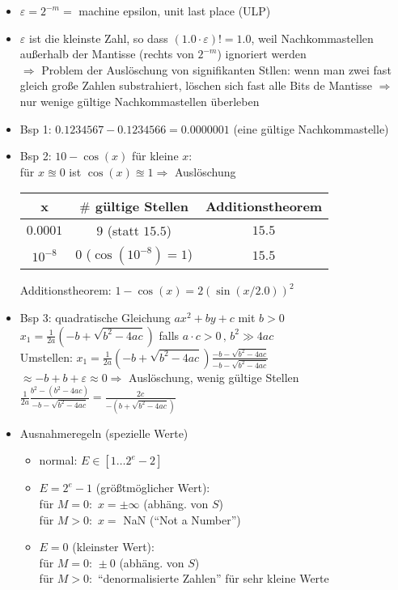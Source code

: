 \documentclass{article}
\begin{document}
	\begin{itemize}
		\item $\varepsilon = 2^{-m} =$ machine epsilon, unit last place (ULP)
		\item $\varepsilon $ ist die kleinste Zahl, so dass $(1.0 \cdot \varepsilon)! = 1.0 $, weil Nachkommastellen außerhalb der Mantisse (rechts von $2^{-m} $) ignoriert werden \\
		$\Rightarrow $ Problem der Auslöschung von signifikanten Stllen: wenn man zwei fast gleich große Zahlen substrahiert, löschen sich fast alle Bits de Mantisse $\Rightarrow $ nur wenige gültige Nachkommastellen überleben
		\item Bsp 1: $0.1234567 - 0.1234566 = 0.0000001$ (eine gültige Nachkommastelle)
		\item Bsp 2: $10-\cos(x)$ für kleine $x$: \\
		für $x \approxeq 0 $ ist $\cos(x) \approxeq 1 \Rightarrow $ Auslöschung
		\begin{tabular} {c|c|c}
        	x & $\#$ gültige Stellen & Additionstheorem\\ \hline
        	$0.0001$ & $9$ (statt $15.5$) & $15.5 $\\
        	$10^{-8} $ & $0$ ($\cos(10^{-8}) = 1$) & $15.5$
		\end{tabular} 
		Additionstheorem: $1-\cos(x) = 2 (\sin(x/2.0))^2 $ \\
		\item Bsp 3: quadratische Gleichung $ax^2 + by + c $ mit $b>0$ \\
		$x_1 = \frac{1}{2a} (-b + \sqrt{b^2 - 4ac}) $ falls $a \cdot c > 0\,, \, b^2 \gg 4ac $ \\
		Umstellen: $x_1 = \frac{1}{2a} (-b + \sqrt{b^2 - 4ac}) \frac{-b - \sqrt{b^2 - 4ac}}{-b - \sqrt{b^2 - 4ac}} $ \\
		$\approx  -b + b + \varepsilon \approx 0 \Rightarrow $ Auslöschung, wenig gültige Stellen \\
		$\frac{1}{2a} \frac{b^2 - (b^2 - 4ac)}{-b - \sqrt{b^2 - 4ac}} = \frac{2c}{-(b+\sqrt{b^2-4ac})}$
		\item Ausnahmeregeln (spezielle Werte)
		\begin{itemize}
			\item normal: $E \in [1 \dots 2^e-2] $
			\item $E = 2^e-1 $ (größtmöglicher Wert): \\
			für $M=0:$ $x = \pm \infty $ (abhäng. von $S$) \\
			für $M>0:$ $x=$ NaN (``Not a Number'')
			\item $E=0$ (kleinster Wert): \\
			für $M=0: \, \pm 0$ (abhäng. von $S$) \\
			für $M>0: $ ``denormalisierte Zahlen'' für sehr kleine Werte
		\end{itemize}
	\end{itemize}
\end{document}
